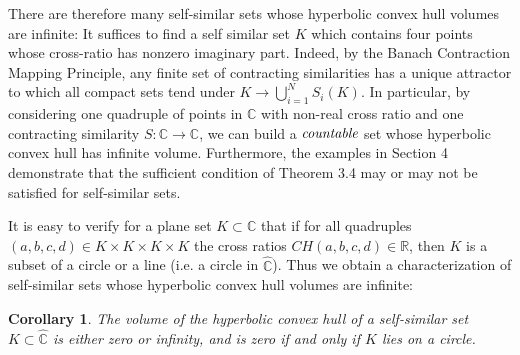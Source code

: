 \documentclass[11pt]{article}
\newtheorem{cor}[tm]{Corollary}
\newcommand\comp{{\mathbb{C}}}
\begin{document}
\bigskip

There are therefore many self-similar sets whose hyperbolic convex hull volumes are infinite: It suffices to find a self similar set $K$ which contains four points whose cross-ratio has nonzero imaginary part. Indeed, by the Banach Contraction Mapping Principle, any finite set of contracting similarities has a unique attractor to which all compact sets tend under $K \rightarrow \bigcup_{i = 1}^N S_i(K)$. In particular, by considering one quadruple of points in $\comp$ with non-real cross ratio and one contracting similarity $S: \comp \rightarrow \comp$, we can build a $\emph{countable}$ set whose hyperbolic convex hull has infinite volume. Furthermore, the examples in Section 4 demonstrate that the sufficient condition of Theorem 3.4 may or may not be satisfied for self-similar sets. 

\bigskip

It is easy to verify for a plane set $K \subset \comp$ that if for all quadruples $(a,b,c,d) \in K \times K \times K \times K$ the cross ratios $CH(a,b,c,d) \in \mathbb{R}$, then $K$ is a subset of a circle or a line (i.e. a circle in $\hat{\comp}$). Thus we obtain a characterization of self-similar sets whose hyperbolic convex hull volumes are infinite:

\begin{cor}
    The volume of the hyperbolic convex hull of a self-similar set $K \subset \hat{\comp}$ is either zero or infinity, and is zero if and only if $K$ lies on a circle. 
\end{cor}
\end{document}
